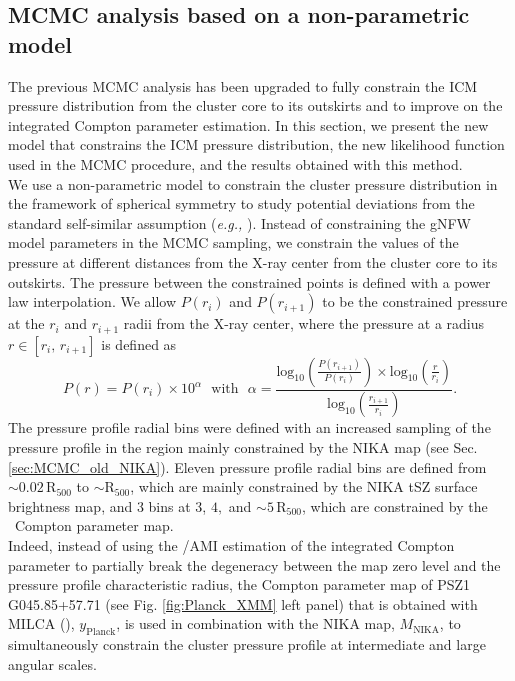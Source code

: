 \documentclass[traditabstract]{aa}
\begin{document}
\subsection{MCMC analysis based on a non-parametric model}\label{sec:nomodeling}

The previous MCMC analysis has been upgraded to fully constrain the ICM pressure distribution from the cluster core to its outskirts and to improve on the integrated Compton parameter estimation. In this section, we present the new model that constrains the ICM pressure distribution, the new likelihood function used in the MCMC procedure, and the results obtained with this method.\\
\indent We use a non-parametric model to constrain the cluster pressure distribution in the framework of spherical symmetry to study potential deviations from the standard self-similar assumption (\emph{e.g.,} \citealt{NonparamPressure}). Instead of constraining the gNFW model parameters in the MCMC sampling, we constrain the values of the pressure at different distances from the X-ray center from the cluster core to its outskirts. The pressure between the constrained points is defined with a power law interpolation. We allow $P(r_i)$ and $P(r_{i+1})$ to be the constrained pressure at the $r_i$ and $r_{i+1}$ radii from the X-ray center, where the pressure at a radius $r \in [r_i, \, r_{i+1}]$ is defined as
\begin{equation}
        P(r) = P(r_i)\times 10^{\alpha}~~~\mathrm{with}~~~ \alpha = \frac{\mathrm{log_{10}}\left(\frac{P(r_{i+1})}{P(r_i)}\right) \times \mathrm{log_{10}}\left(\frac{r}{r_i}\right)}{\mathrm{log_{10}}\left(\frac{r_{i+1}}{r_i}\right)}
\label{eq:interpolation}
.\end{equation}
The pressure profile radial bins were defined with an increased sampling of the pressure profile in the region mainly constrained by the NIKA map (see Sec. \ref{sec:MCMC_old_NIKA}). Eleven pressure profile radial bins are defined from $\sim\!0.02 \, \mathrm{R_{500}}$ to $\sim\!\mathrm{R_{500}}$, which are mainly constrained by the NIKA tSZ surface brightness map, and 3 bins at $3$, $4,$ and $\sim\!5 \, \mathrm{R_{500}}$, which are constrained by the \planck\ Compton parameter map.\\
\indent Indeed, instead of using the \planck/AMI estimation of the integrated Compton parameter to partially break the degeneracy between the map zero level and the pressure profile characteristic radius, the Compton parameter map of \mbox{PSZ1\,G045.85+57.71} (see Fig. \ref{fig:Planck_XMM} left panel) that is obtained with MILCA (\citealt{ymap_planck}), $y_{\mathrm{Planck}}$, is used in combination with the NIKA map, $M_{\mathrm{NIKA}}$, to simultaneously constrain the cluster pressure profile at intermediate and large angular scales.\\
\end{document}

